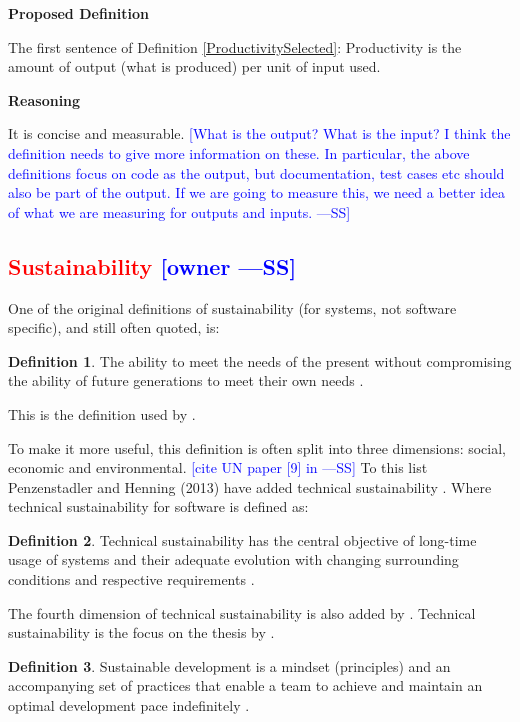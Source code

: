 \documentclass[letterpaper,cleveref]{lipics-v2019}
\newcommand{\authornote}[3]{\textcolor{#1}{[#3 ---#2]}}
\newcommand{\authornote}[3]{}
\newcommand{\wss}[1]{\authornote{blue}{SS}{#1}} %
\newcommand{\notdone}[1]{\textcolor{red}{#1}}
\theoremstyle{definition}
\newtheorem{defn}{Definition}
\begin{document}
\noindent \textbf{Proposed Definition} 

The first sentence of Definition \ref{ProductivitySelected}: Productivity is the
amount of output (what is produced) per unit of input used.

\noindent \textbf{Reasoning}

It is concise and measurable. \wss{What is the output?  What is the input?  I
  think the definition needs to give more information on these.  In particular,
  the above definitions focus on code as the output, but documentation, test
  cases etc should also be part of the output.  If we are going to measure this,
  we need a better idea of what we are measuring for outputs and inputs.}

\subsection{\notdone{Sustainability} \wss{owner}}

One of the original definitions of sustainability (for systems, not software
specific), and still often quoted, is:

\begin{defn}
\noindent The ability to meet the needs of the present without compromising the ability of
future generations to meet their own needs \citep{Brundtland1987}.
\end{defn}

This is the definition used by \citet{IISD2019}.

To make it more useful, this definition is often split into three dimensions:
social, economic and environmental. \wss{cite UN paper [9] in
  \citet{PenzenstadlerAndHenning2013}}  To this list Penzenstadler and Henning
(2013) have added technical sustainability \citep{PenzenstadlerAndHenning2013}.
Where technical sustainability for software is defined as:

\begin{defn}
\noindent Technical sustainability has the central objective of long-time
usage of systems and their adequate evolution with changing surrounding
conditions and respective requirements \citep{PenzenstadlerAndHenning2013}.
\end{defn}

The fourth dimension of technical sustainability is also added
by \citep{WolframEtAl2017}.  Technical sustainability is the focus on the thesis
by \citet{Hygerth2016}.

\begin{defn}
  \noindent Sustainable development is a mindset (principles) and an
  accompanying set of practices that enable a team to achieve and maintain an
  optimal development pace indefinitely \citep{Tate2005}.
\end{defn}
\end{document}
